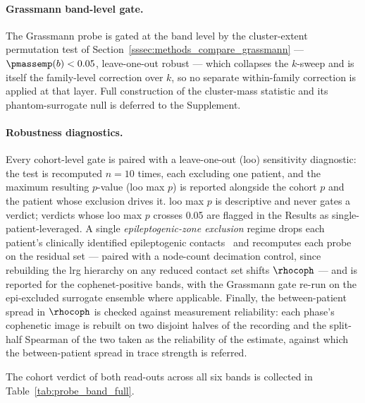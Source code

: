 \paragraph{Grassmann band-level gate.}
The Grassmann probe is gated at the band level by the cluster-extent permutation test of Section~\ref{sssec:methods_compare_grassmann} --- \(\pmassemp(b) < 0.05\), leave-one-out robust --- which collapses the \(k\)-sweep and is itself the family-level correction over \(k\), so no separate within-family correction is applied at that layer. Full construction of the cluster-mass statistic and its phantom-surrogate null is deferred to the Supplement.

\paragraph{Robustness diagnostics.}
Every cohort-level gate is paired with a leave-one-out (\gls{loo}) sensitivity diagnostic: the test is recomputed \(n = 10\) times, each excluding one patient, and the maximum resulting \(p\)-value (\gls{loo} max \(p\)) is reported alongside the cohort \(p\) and the patient whose exclusion drives it. \gls{loo} max \(p\) is descriptive and never gates a verdict; verdicts whose \gls{loo} max \(p\) crosses \num{0.05} are flagged in the Results as single-patient-leveraged. A single \emph{epileptogenic-zone exclusion} regime drops each patient's clinically identified epileptogenic contacts~\cite{cardinale2013stereoelectroencephalography} and recomputes each probe on the residual set --- paired with a node-count decimation control, since rebuilding the \gls{lrg} hierarchy on any reduced contact set shifts \(\rhocoph\) --- and is reported for the cophenet-positive bands, with the Grassmann gate re-run on the epi-excluded surrogate ensemble where applicable. Finally, the between-patient spread in \(\rhocoph\) is checked against measurement reliability: each phase's cophenetic image is rebuilt on two disjoint halves of the recording and the split-half Spearman of the two taken as the reliability of the estimate, against which the between-patient spread in trace strength is referred.

The cohort verdict of both read-outs across all six bands is collected in Table~\ref{tab:probe_band_full}.

